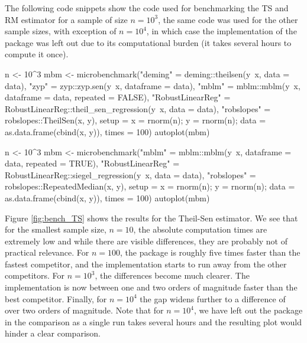 The following code snippets show the code used for benchmarking the TS and RM estimator for a sample of size $n = 10^3$, the same code was used for the other sample sizes, with exception of $n = 10^4$, in which case the implementation of the  package was left out due to its computational burden (it takes several hours to compute it once).

\begin{example}
n   <- 10^3
mbm <- microbenchmark("deming" = deming::theilsen(y~x, data = data),
                      "zyp" = zyp::zyp.sen(y~x, dataframe = data),
                      "mblm" = mblm::mblm(y~x, dataframe = data, repeated = FALSE),
                      "RobustLinearReg" = RobustLinearReg::theil_sen_regression(y~x,
		      data = data),
                      "robslopes" = robslopes::TheilSen(x, y),
                      setup = {x = rnorm(n); y = rnorm(n);
                      data = as.data.frame(cbind(x, y))}, times = 100)
autoplot(mbm)
\end{example}


\begin{example}
n   <- 10^3
mbm <- microbenchmark("mblm" = mblm::mblm(y~x, dataframe = data, repeated = TRUE),
                      "RobustLinearReg" = RobustLinearReg::siegel_regression(y~x,
		      data = data),
                      "robslopes" = robslopes::RepeatedMedian(x, y),
                      setup = {x = rnorm(n); y = rnorm(n);
                      data = as.data.frame(cbind(x, y))}, times = 100)
autoplot(mbm)
\end{example}
										

Figure \ref{fig:bench_TS} shows the results for the Theil-Sen estimator. We see that for the smallest sample size, $n = 10$, the absolute computation times are extremely low and while there are visible differences, they are probably not of practical relevance. For $n=100$, the  package is roughly five times faster than the fastest competitor, and the  implementation starts to run away from the other competitors.  For $n = 10^3$, the differences become much clearer. The  implementation is now between one and two orders of magnitude faster than the best competitor. Finally, for $n = 10^4$ the gap widens further to a difference of over two orders of magnitude. Note that for $n = 10^4$, we have left out the  package in the comparison as a single run takes several hours and the resulting plot would hinder a clear comparison.

